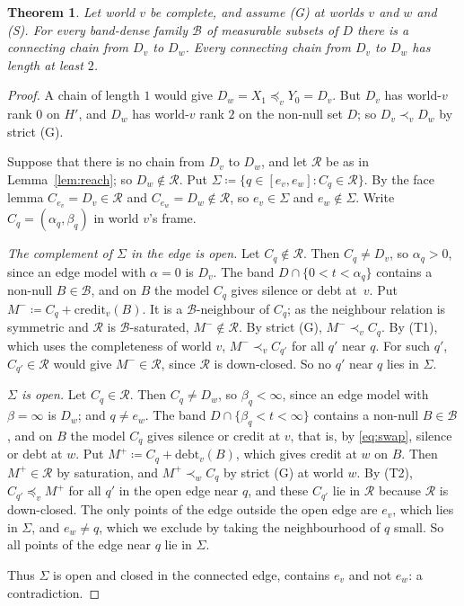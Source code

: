 \documentclass[11pt]{article}
\newtheorem{theorem}{Theorem}
\theoremstyle{definition}\newtheorem{definition}[theorem]{Definition}
\theoremstyle{remark}\newtheorem{remark}[theorem]{Remark}
\newcommand{\debt}{\mathrm{debt}}
\newcommand{\cred}{\mathrm{credit}}
\newcommand{\Bfam}{\mathcal B}
\begin{document}
\begin{theorem}\label{thm:cut}
Let world $v$ be complete, and assume (G) at worlds $v$ and $w$ and (S). For
every band-dense family $\Bfam$ of measurable subsets of $D$ there is a
connecting chain from $D_v$ to $D_w$. Every connecting chain from $D_v$ to
$D_w$ has length at least $2$.
\end{theorem}
\begin{proof}
A chain of length $1$ would give $D_w=X_1\preceq_vY_0=D_v$. But $D_v$ has
world-$v$ rank $0$ on $H'$, and $D_w$ has world-$v$ rank $2$ on the non-null
set $D$; so $D_v\prec_vD_w$ by strict (G).

Suppose that there is no chain from $D_v$ to $D_w$, and let $\mathcal R$ be
as in Lemma~\ref{lem:reach}; so $D_w\notin\mathcal R$. Put
$\Sigma\coloneqq\{q\in[e_v,e_w]:C_q\in\mathcal R\}$. By the face lemma
$C_{e_v}=D_v\in\mathcal R$ and $C_{e_w}=D_w\notin\mathcal R$, so
$e_v\in\Sigma$ and $e_w\notin\Sigma$. Write $C_q=(\alpha_q,\beta_q)$ in
world $v$'s frame.

\emph{The complement of $\Sigma$ in the edge is open.} Let
$C_q\notin\mathcal R$. Then $C_q\ne D_v$, so $\alpha_q>0$, since an edge
model with $\alpha=0$ is $D_v$. The band $D\cap\{0<t<\alpha_q\}$ contains a
non-null $B\in\Bfam$, and on $B$ the model $C_q$ gives silence or debt
at~$v$. Put $M^-\coloneqq C_q+\cred_v(B)$. It is a $\Bfam$-neighbour of
$C_q$; as the neighbour relation is symmetric and $\mathcal R$ is
$\Bfam$-saturated, $M^-\notin\mathcal R$. By strict (G), $M^-\prec_vC_q$.
By (T1), which uses the completeness of world $v$, $M^-\prec_vC_{q'}$ for
all $q'$ near $q$. For such $q'$, $C_{q'}\in\mathcal R$ would give
$M^-\in\mathcal R$, since $\mathcal R$ is down-closed. So no $q'$ near $q$
lies in $\Sigma$.

\emph{$\Sigma$ is open.} Let $C_q\in\mathcal R$. Then $C_q\ne D_w$, so
$\beta_q<\infty$, since an edge model with $\beta=\infty$ is $D_w$; and
$q\ne e_w$. The band $D\cap\{\beta_q<t<\infty\}$ contains a non-null
$B\in\Bfam$, and on $B$ the model $C_q$ gives silence or credit at $v$, that
is, by \eqref{eq:swap}, silence or debt at $w$. Put
$M^+\coloneqq C_q+\debt_v(B)$, which gives credit at $w$ on $B$. Then
$M^+\in\mathcal R$ by saturation, and $M^+\prec_wC_q$ by strict (G) at
world $w$. By (T2), $C_{q'}\preceq_vM^+$ for all $q'$ in the open edge near
$q$, and these $C_{q'}$ lie in $\mathcal R$ because $\mathcal R$ is
down-closed. The only points of the edge outside the open edge are $e_v$,
which lies in $\Sigma$, and $e_w\ne q$, which we exclude by taking the
neighbourhood of $q$ small. So all points of the edge near $q$ lie in
$\Sigma$.

Thus $\Sigma$ is open and closed in the connected edge, contains $e_v$ and
not $e_w$: a contradiction.
\end{proof}
\end{document}
